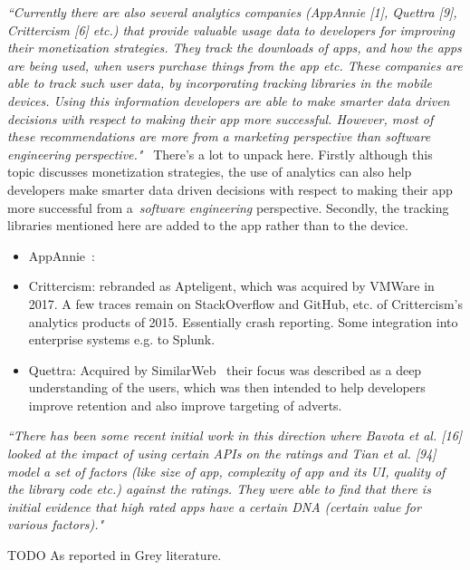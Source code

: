 \emph{``Currently there are also several analytics companies (AppAnnie [1], Quettra [9], Crittercism [6] etc.) that provide valuable usage data to developers for improving their monetization strategies. They track the downloads of apps, and how the apps are being used, when users purchase things from the app etc. These companies are able to track such user data, by incorporating tracking libraries in the mobile devices. Using this information developers are able to make smarter data driven decisions with respect to making their app more successful. However, most of these recommendations are more from a marketing perspective than software engineering perspective."}~\citep[p. 28]{nagappan2016_future_trends_in_sw_eng_for_mobile_apps} 
There's a lot to unpack here. Firstly although this topic discusses monetization strategies, the use of analytics can also help developers make smarter data driven decisions with respect to making their app more successful from a~\emph{software engineering} perspective. Secondly, the tracking libraries mentioned here are added to the app rather than to the device. 
\begin{itemize}
    \item AppAnnie~\citep{appannie2021}: 
    \item Crittercism: rebranded as Apteligent, which was acquired by VMWare in 2017. A few traces remain on StackOverflow and GitHub, etc. of Crittercism's analytics products of 2015. Essentially crash reporting. Some integration into enterprise systems e.g. to Splunk.
    \item Quettra: Acquired by SimilarWeb~\citep{techcrunch2015_quettra_mobile_analytics_acquired} their focus was described as a deep understanding of the users, which was then intended to help developers improve retention and also improve targeting of adverts.
\end{itemize}

\emph{``There has been some recent initial work in this direction where Bavota et al. [16] looked at the impact of using certain APIs on the ratings and Tian et al. [94] model a set of factors (like size of app, complexity of app and its UI, quality of the library code etc.) against the ratings. They were able to find that there is initial evidence that high rated apps have a certain DNA (certain value for various factors)."}~\citep[p. 29]{nagappan2016_future_trends_in_sw_eng_for_mobile_apps} 


TODO As reported in Grey literature.

